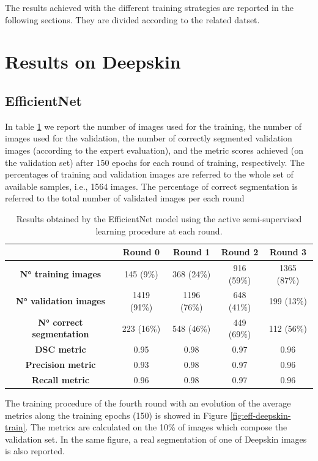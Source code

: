 \documentclass[../main.tex]{subfiles}
\begin{document}
The results achieved with the different training strategies are reported in the following sections.
They are divided according to the related datset.

\section{Results on Deepskin}
\subsection{EfficientNet}

In table \ref{tab:results-eff-deepskin} we report the number of images used for the training, the number of images used for the validation, the number of correctly segmented validation images (according to the expert evaluation), and the metric scores achieved (on the validation set) after 150 epochs for each round of training, respectively. 
The percentages of training and validation images are referred to the whole set of available samples, i.e., 1564 images. 
The percentage of correct segmentation is referred to the total number of validated images per each round
\begin{table}[H]
    \centering
    \begin{tabular}{c|c|c|c|c|}
 
        \textbf{} & \textbf{Round 0} & \textbf{Round 1} & \textbf{Round 2} & \textbf{Round 3 } \\ \hline
        \textbf{N° training images} & 145 (9\%) & 368 (24\%) & 916 (59\%) & 1365 (87\%)  \\ \hline
        \textbf{N° validation images} & 1419 (91\%) & 1196 (76\%) & 648 (41\%) & 199 (13\%)  \\ \hline
        \textbf{N° correct segmentation} & 223 (16\%) & 548 (46\%) & 449 (69\%) & 112 (56\%)  \\ \hline
        \textbf{DSC metric} & 0.95 & 0.98 & 0.97 & 0.96  \\ \hline
        \textbf{Precision metric} & 0.93 & 0.98 & 0.97 & 0.96  \\ \hline
        \textbf{Recall metric} & 0.96 & 0.98 & 0.97 & 0.96  \\ \hline
    \end{tabular}
    \caption{Results obtained by the EfficientNet model using the active semi-supervised learning procedure at each round.}
    \label{tab:results-eff-deepskin}
\end{table}

The training procedure of the fourth round with an evolution of the average metrics along the training epochs (150) is showed in Figure \ref{fig:eff-deepskin-train}. The metrics are calculated on the 10\% of images which compose the validation set.
In the same figure, a real segmentation of one of Deepskin images is also reported.
\end{document}
